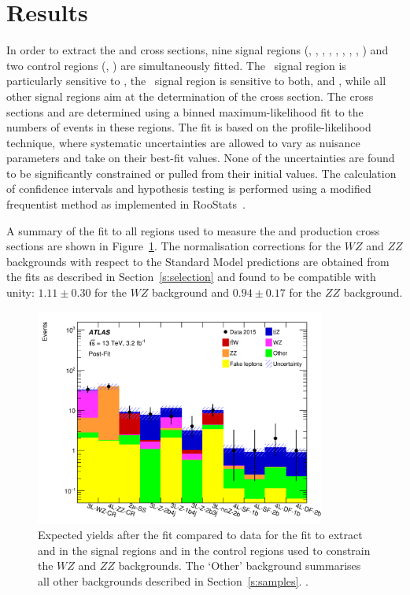 \section{Results}
\label{s:results}

In order to extract the \ttZ and \ttW cross sections, nine signal regions (\SSLSR, 
\TLSRA, \TLSRB, \TLSRC, \TLSRD, \FLSRB, \FLSRC, \FLSRD, \FLSRE) and two control regions
(\TLCR, \FLCR) are simultaneously fitted. 
The \SSLSR\ signal region is particularly sensitive to \ttW, the \TLSRD\ signal region 
is sensitive to both, \ttW and \ttZ, while all other signal regions aim at the determination
of the \ttZ cross section.
The cross sections \sttZ and \sttW are determined using a binned maximum-likelihood fit
to the numbers of events in these regions. 
The fit is based on the profile-likelihood
technique, where systematic uncertainties are allowed to vary as nuisance
parameters and take on their best-fit values.  None of the uncertainties are
found to be significantly constrained or pulled from their initial values.  The calculation of confidence intervals and
hypothesis testing is performed using a modified frequentist method as implemented in RooStats~\cite{RooFit,RooFitManual}.

A summary of the fit to all regions used to measure the \ttZ and \ttW
production cross sections are shown in Figure~\ref{fig:allyields}.  The
normalisation corrections for the $WZ$ and $ZZ$ backgrounds with respect to the
Standard Model predictions are obtained from the fits as described in
Section~\ref{s:selection} and found to be compatible with unity: 
$1.11 \pm 0.30$
for the $WZ$ background and
$0.94 \pm 0.17$
for the $ZZ$ background.
\vspace{1ex}

\begin{figure}[htbp]
\centering
\includegraphics[width=0.85\textwidth]{Summary_ttWZ}
\caption{Expected yields after the fit compared to data for the
fit to extract \sttZ and \sttW in the signal regions and in the control regions
used to constrain the $WZ$ and $ZZ$ backgrounds.  The `Other' background
summarises all other backgrounds described in Section~\ref{s:samples}.  
\hatch.\label{fig:allyields}}
\end{figure}

